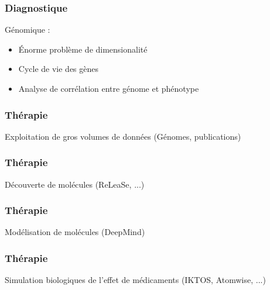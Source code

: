 \begin{frame}
  \frametitle{Diagnostique}
  Génomique :
  \newline
  \begin{minipage}[c]{0.49\linewidth}
    \begin{itemize}
    \item Énorme problème de dimensionalité
    \item Cycle de vie des gènes
    \item Analyse de corrélation entre génome et phénotype
    \end{itemize}
  \end{minipage}\hfill
  \begin{minipage}[c]{0.49\linewidth}
  \end{minipage}\hfill
\end{frame}

\begin{frame}
  \frametitle{Thérapie}
  Exploitation de gros volumes de données (Génomes, publications)
  \newline
  \newline
  \begin{minipage}[c]{0.49\linewidth}
  \end{minipage}\hfill
  \begin{minipage}[c]{0.49\linewidth}
  \end{minipage}\hfill
\end{frame}


\begin{frame}
  \frametitle{Thérapie}
  Découverte de molécules (ReLeaSe, ...) 
\end{frame}

\begin{frame}
  \frametitle{Thérapie}
  Modélisation de molécules (DeepMind)
\end{frame}

\begin{frame}
  \frametitle{Thérapie}
  \begin{minipage}[c]{0.49\linewidth}
    Simulation biologiques de l'effet de médicaments (IKTOS, Atomwise, ...)
  \end{minipage}\hfill
  \begin{minipage}[c]{0.49\linewidth}
  \end{minipage}\hfill
\end{frame}

